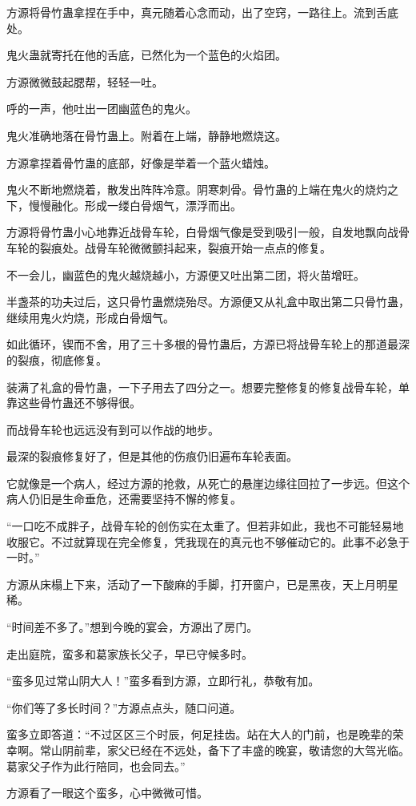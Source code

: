 \begin{this_body}
方源将骨竹蛊拿捏在手中，真元随着心念而动，出了空窍，一路往上。流到舌底处。

鬼火蛊就寄托在他的舌底，已然化为一个蓝色的火焰团。

方源微微鼓起腮帮，轻轻一吐。

呼的一声，他吐出一团幽蓝色的鬼火。

鬼火准确地落在骨竹蛊上。附着在上端，静静地燃烧这。

方源拿捏着骨竹蛊的底部，好像是举着一个蓝火蜡烛。

鬼火不断地燃烧着，散发出阵阵冷意。阴寒刺骨。骨竹蛊的上端在鬼火的烧灼之下，慢慢融化。形成一缕白骨烟气，漂浮而出。

方源将骨竹蛊小心地靠近战骨车轮，白骨烟气像是受到吸引一般，自发地飘向战骨车轮的裂痕处。战骨车轮微微颤抖起来，裂痕开始一点点的修复。

不一会儿，幽蓝色的鬼火越烧越小，方源便又吐出第二团，将火苗增旺。

半盏茶的功夫过后，这只骨竹蛊燃烧殆尽。方源便又从礼盒中取出第二只骨竹蛊，继续用鬼火灼烧，形成白骨烟气。

如此循环，锲而不舍，用了三十多根的骨竹蛊后，方源已将战骨车轮上的那道最深的裂痕，彻底修复。

装满了礼盒的骨竹蛊，一下子用去了四分之一。想要完整修复的修复战骨车轮，单靠这些骨竹蛊还不够得很。

而战骨车轮也远远没有到可以作战的地步。

最深的裂痕修复好了，但是其他的伤痕仍旧遍布车轮表面。

它就像是一个病人，经过方源的抢救，从死亡的悬崖边缘往回拉了一步远。但这个病人仍旧是生命垂危，还需要坚持不懈的修复。

“一口吃不成胖子，战骨车轮的创伤实在太重了。但若非如此，我也不可能轻易地收服它。不过就算现在完全修复，凭我现在的真元也不够催动它的。此事不必急于一时。”

方源从床榻上下来，活动了一下酸麻的手脚，打开窗户，已是黑夜，天上月明星稀。

“时间差不多了。”想到今晚的宴会，方源出了房门。

走出庭院，蛮多和葛家族长父子，早已守候多时。

“蛮多见过常山阴大人！”蛮多看到方源，立即行礼，恭敬有加。

“你们等了多长时间？”方源点点头，随口问道。

蛮多立即答道：“不过区区三个时辰，何足挂齿。站在大人的门前，也是晚辈的荣幸啊。常山阴前辈，家父已经在不远处，备下了丰盛的晚宴，敬请您的大驾光临。葛家父子作为此行陪同，也会同去。”

方源看了一眼这个蛮多，心中微微可惜。


\end{this_body}
